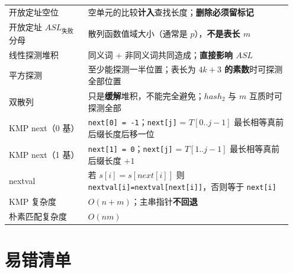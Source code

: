 \documentclass[11pt,openany,UTF8]{ctexbook}
\begin{document}
\begin{longtable}{@{}L{0.2664\linewidth}L{0.6793\linewidth}@{}}
开放定址空位 & 空单元的比较\textbf{计入}查找长度；\textbf{删除必须留标记} \\
开放定址 $ASL_{失败}$ 分母 & 散列函数值域大小（通常是 $p$），\textbf{不是表长 $m$} \\
线性探测堆积 & 同义词 + 非同义词共同造成；\textbf{直接影响 $ASL$} \\
平方探测 & 至少能探测一半位置；表长为 \textbf{$4k+3$ 的素数}时可探测全部位置 \\
双散列 & 只是\textbf{缓解}堆积，不能完全避免；$hash_2$ 与 $m$ 互质时可探测全部 \\
KMP next（0 基） & \texttt{next[0]\allowbreak{} =\allowbreak{} -1}；\texttt{next[j]\allowbreak{}} = $T[0..j-1]$ 最长相等真前后缀长度后移一位 \\
KMP next（1 基） & \texttt{next[1]\allowbreak{} =\allowbreak{} 0}；\texttt{next[j]\allowbreak{}} = $T[1..j-1]$ 最长相等真前后缀长度 $+1$ \\
nextval & 若 $s[i]=s[next[i]]$ 则 \texttt{nextval[i]\allowbreak{}=\allowbreak{}nextval[next[i]\allowbreak{}]\allowbreak{}}，否则等于 \texttt{next[i]\allowbreak{}} \\
KMP 复杂度 & $O(n+m)$；主串指针\textbf{不回退} \\
朴素匹配复杂度 & $O(nm)$ \\
\bottomrule
\end{longtable}
\endgroup

\section*{易错清单}
\end{document}
